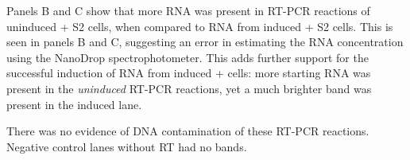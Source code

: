 Panels B and C show that more RNA was present in RT-PCR reactions of uninduced \stim+ S2 cells, when compared to RNA from \cuso{} induced \stim+ S2 cells. This is seen in panels B and C, suggesting an error in estimating the RNA concentration using the NanoDrop spectrophotometer. This adds further support for the successful induction of \stim{} RNA from \cuso{} induced \stim+ cells: more starting RNA was present in the \emph{uninduced} RT-PCR reactions, yet a much brighter \stim{} band was present in the induced lane.

There was no evidence of DNA contamination of these RT-PCR reactions. Negative control lanes without RT had no bands.  

\newpage



